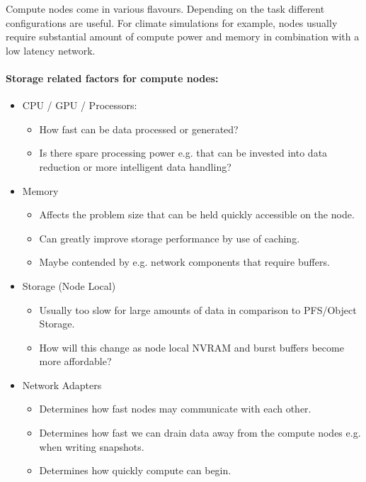 \documentclass{../../template/esiwace-report}
\begin{document}
Compute nodes come in various flavours.
Depending on the task different configurations are useful.
For climate simulations for example, nodes usually require substantial amount of compute power and memory in combination with a low latency network.

\paragraph{Storage related factors for compute nodes:}
\begin{itemize}
	\item  CPU / GPU / Processors:
	\begin{itemize}
		\item How fast can be data processed or generated?
		\item Is there spare processing power e.g. that can be invested into data reduction or more intelligent data handling?
	\end{itemize}

	\item Memory
	\begin{itemize}
		\item Affects the problem size that can be held quickly accessible on the node.
		\item Can greatly improve storage performance by use of caching.
		\item Maybe contended by e.g. network components that require buffers.
	\end{itemize}

	\item Storage (Node Local)
	\begin{itemize}
		\item Usually too slow for large amounts of data in comparison to PFS/Object Storage.
		\item How will this change as node local NVRAM and burst buffers become more affordable?
	\end{itemize}

	\item Network Adapters
	\begin{itemize}
		\item Determines how fast nodes may communicate with each other.
		\item Determines how fast we can drain data away from the compute nodes e.g. when writing snapshots.
		\item Determines how quickly compute can begin.
	\end{itemize}

\end{itemize}
\end{document}
